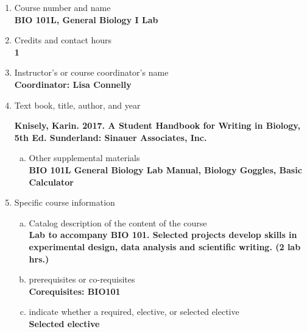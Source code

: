 \label{BIO101L}  %
\begin{enumerate}[1.]
\item Course number and name\\
  {\bfseries
    BIO 101L, General Biology I Lab
  }
  
\item Credits and contact hours\\
  {\bfseries
    1    
  }

\item Instructor's or course coordinator's name\\
  {\bfseries
    Coordinator: Lisa Connelly
  }

\item Text book, title, author, and year\\
  {\bfseries
    Knisely, Karin. 2017. A Student Handbook for Writing in Biology, 5th Ed. Sunderland: Sinauer Associates,
Inc.
    
  }
\begin{enumerate}[a.]
\item Other supplemental materials\\
  {\bfseries
    BIO 101L General Biology Lab Manual, Biology Goggles, Basic Calculator
  }
\end{enumerate}

\item Specific course information
\begin{enumerate}[a.]  
\item Catalog description of the content of the course\\
  {\bfseries
    Lab to accompany BIO 101. Selected projects develop skills in experimental design, data analysis and scientific writing. (2 lab hrs.)    
  }

\item prerequisites or co-requisites\\
  {\bfseries
    Corequisites: BIO101
  }

\item indicate whether a required, elective, or selected elective\\ %
  {\bfseries
    Selected elective
  }


\end{enumerate}
\end{enumerate}
